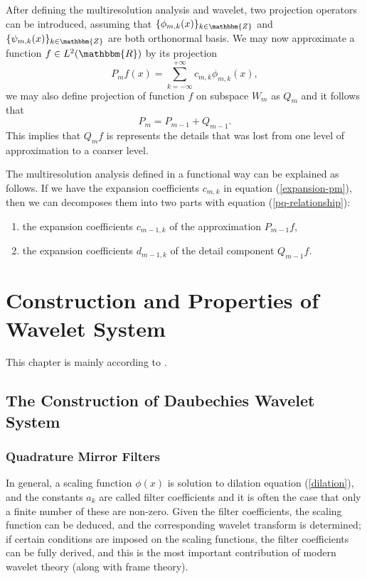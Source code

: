 \documentclass{book}
\newenvironment{enumeratenumeric}{\begin{enumerate}[1.] }{\end{enumerate}}
\begin{document}
After defining the multiresolution analysis and wavelet, two projection
operators can be introduced, assuming that $\{ \phi_{m, k} (x) \}_{k \in
\mathbbm{Z}}$ and $\{ \psi_{m, k} (x) \}_{k \in \mathbbm{Z}}$ are both
orthonormal basis. We may now approximate a function $f \in L^2 (\mathbbm{R})$
by its projection
\begin{equation}
  P_m f (x) = \sum_{k = - \infty}^{+ \infty} c_{m, k} \phi_{m, k} (x),
  \label{expansion-pm}
\end{equation}
we may also define projection of function $f$ on subspace $W_m$ as $Q_m$ and
it follows that
\begin{equation}
  P_m = P_{m - 1} + Q_{m - 1} . \label{pq-relationship}
\end{equation}
This implies that $Q_m f$ is represents the details that was lost from one
level of approximation to a coarser level.

The multiresolution analysis defined in a functional way can be explained as
follows. If we have the expansion coefficients $c_{m, k}$ in equation
(\ref{expansion-pm}), then we can decomposes them into two parts with equation
(\ref{pq-relationship}):
\begin{enumeratenumeric}
  \item the expansion coefficients $c_{m - 1, k}$ of the approximation $P_{m -
  1} f$,
  
  \item the expansion coefficients $d_{m - 1, k}$ of the detail component
  $Q_{m - 1} f.$
\end{enumeratenumeric}
\chapter{Construction and Properties of Wavelet
System}\label{chap:ConstructionWaveletSystem}

This chapter is mainly according to {\cite{williams1994introduction}}.

\section{The Construction of Daubechies Wavelet System}

\subsection{Quadrature Mirror Filters}

In general, a scaling function $\phi (x)$ is solution to dilation equation
(\ref{dilation}), and the constants $a_k$ are called filter coefficients and
it is often the case that only a finite number of these are non-zero. Given
the filter coefficients, the scaling function can be deduced, and the
corresponding wavelet transform is determined; if certain conditions are
imposed on the scaling functions, the filter coefficients can be fully
derived, and this is the most important contribution of modern wavelet theory
(along with frame theory).
\end{document}
